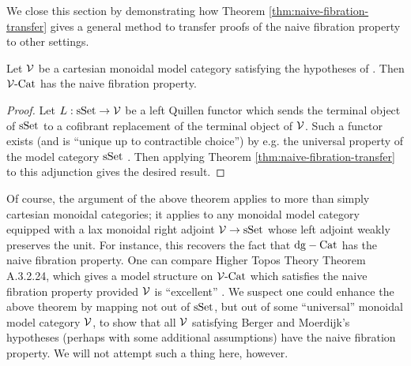 \documentclass[12pt]{amsart}
\begin{document}
We close this section by demonstrating how Theorem \ref{thm:naive-fibration-transfer} gives a general method to transfer proofs of the naive fibration property to other settings.
\begin{corollary}\label{thm:naive-fibration-cartesian}
	Let $\mathcal{V}$ be a cartesian monoidal model category satisfying the hypotheses of \cite[Theorem 1.10]{BergerMoerdijk2012}. Then $\mathcal{V}\text{-}\mathrm{Cat}$ has the naive fibration property.
\end{corollary}
\begin{proof}
	Let $L: \mathrm{sSet} \to \mathcal{V}$ be a left Quillen functor which sends the terminal object of $\mathrm{sSet}$ to a cofibrant replacement of the terminal object of $\mathcal{V}$. Such a functor exists (and is ``unique up to contractible choice'') by e.g. the universal property of the model category $\mathrm{sSet}$ \cite{Dugger2001}. 
	Then applying Theorem \ref{thm:naive-fibration-transfer} to this adjunction gives the desired result.
\end{proof}
Of course, the argument of the above theorem applies to more than simply cartesian monoidal categories; it applies to any monoidal model category equipped with a lax monoidal right adjoint $\mathcal{V} \to \mathrm{sSet}$ whose left adjoint weakly preserves the unit. 
For instance, this recovers the fact that $\mathrm{dg}-\mathrm{Cat}$ has the naive fibration property.
One can compare Higher Topos Theory Theorem A.3.2.24, which gives a model structure on $\mathcal{V}\text{-}\mathrm{Cat}$ which satisfies the naive fibration property provided $\mathcal{V}$ is ``excellent'' \cite{LurieHTT}.
We suspect one could enhance the above theorem by mapping not out of $\mathrm{sSet}$, but out of some ``universal'' monoidal model category $\mathcal{V}$, to show that all $\mathcal{V}$ satisfying Berger and Moerdijk's hypotheses (perhaps with some additional assumptions) have the naive fibration property.
We will not attempt such a thing here, however.
\end{document}
